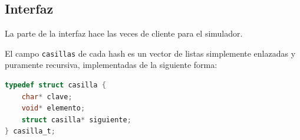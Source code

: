 \documentclass[titlepage,a4paper]{article}
\begin{document}
\subsection{Interfaz}

La parte de la interfaz hace las veces de cliente para el simulador. 

El campo \lstinline{casillas} de cada hash es un vector de listas simplemente
enlazadas y puramente recursiva, implementadas de la siguiente forma:

\begin{lstlisting}[language=C]
typedef struct casilla {
	char* clave;
	void* elemento;
	struct casilla* siguiente;
} casilla_t;
\end{lstlisting}
\end{document}
